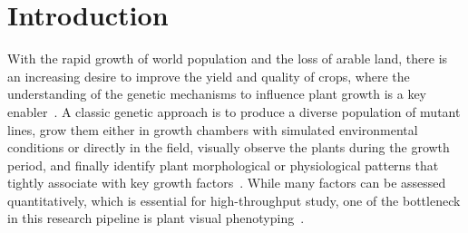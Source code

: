 \section{Introduction}
\label{sec:intro}

With the rapid growth of world population and the loss of arable land, there is an increasing desire to improve the yield and quality of crops, where the understanding of the genetic mechanisms to influence plant growth is a key enabler~\cite{doos2002population}.
%
A classic genetic approach is to produce a diverse population of mutant lines, grow them either in growth chambers with simulated environmental conditions or directly in the field, visually observe the plants during the growth period, and finally identify plant morphological or physiological patterns that tightly associate with key growth factors~\cite{houle2010phenomics}.
%
While many factors can be assessed quantitatively, which is essential for high-throughput study, one of the bottleneck in this research pipeline is plant visual phenotyping~\cite{walter2015plant}.


